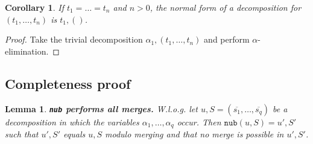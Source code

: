 \documentclass[a4paper, 11pt]{report}
\newtheorem{corollary}{Corollary}
\newtheorem{lemma}{Lemma}
\begin{document}
\begin{corollary}
If $t_1 = \dots = t_n$ and $n > 0$, the normal form of a decomposition for $(t_1,\dots,t_n)$ is $t_1,()$.
\label{cor:allTermsEq}
\end{corollary}

\begin{proof}
Take the trivial decomposition $\alpha_1,(t_1,\dots,t_n)$ and perform $\alpha$-elimination.
\end{proof}



\medskip


\subsection{Completeness proof}

\begin{lemma}
\textbf{\texttt{nub} performs all merges.}
W.l.o.g. let $u,S = (\overline{s_1},\dots,\overline{s_q})$ be a decomposition in which the variables $\alpha_1,\dots,\alpha_q$ occur. Then $\texttt{nub}(u,S) = u',S'$ such that $u',S'$ equals $u,S$ modulo merging and that no merge is possible in $u',S'$.
\label{thm:nubAllMerges}
\end{lemma}
\end{document}
